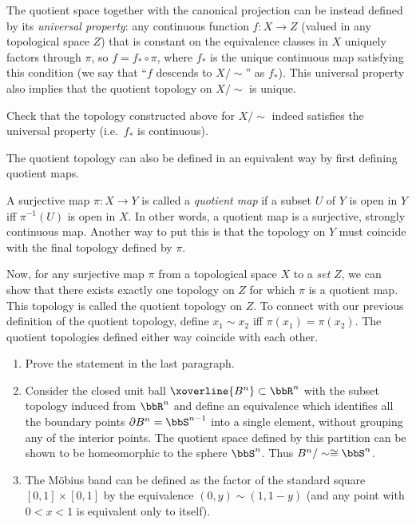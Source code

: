 The quotient space together with the canonical projection can be instead defined by its \emph{universal property}: any continuous function $f:X\to Z$ (valued in any topological space $Z$) that is constant on the equivalence classes in $X$ uniquely factors through  $\pi$, so $f=f_\ast\circ\pi$, where $f_\ast$ is the unique continuous map satisfying this condition (we say that ``$f$ descends to $X/\sim$'' as $f_\ast$). This universal property also implies that the quotient topology on $X\slash\sim$ is unique.

\begin{xca}
Check that the topology constructed above for $X/\sim$ indeed satisfies the universal property (i.e.\ $f_\ast$ is continuous).
\end{xca}

The quotient topology can also be defined in an equivalent way by first defining quotient maps.
\begin{defn}
A surjective map $\pi:X\rightarrow Y$ is called a \emph{quotient map} if a subset $U$ of $Y$ is open in $Y$ iff $\pi^{-1}(U)$ is open in $X$. In other words, a quotient map is a surjective, strongly continuous map. Another way to put this is that the topology on $Y$ must coincide with the final topology defined by $\pi$.
\end{defn}

Now, for any surjective map $\pi$ from a topological space $X$ to a \emph{set} $Z$, we can show that there exists exactly one topology on $Z$ for which $\pi$ is a quotient map. This topology is called the quotient topology on $Z$. To connect with our previous definition of the quotient topology, define $x_1\sim x_2$ iff $\pi(x_1)=\pi(x_2)$. The quotient topologies defined either way coincide with each other.

\begin{example}
\begin{enumerate}
    \item Prove the statement in the last paragraph.
    \item Consider the closed unit ball $\xoverline{B^n}\subset\bbR^n$ with the subset topology induced from $\bbR^n$ and define an equivalence which identifies all the boundary points $\partial B^n = \bbS^{n-1}$ into a single element, without grouping any of the interior points. The quotient space defined by this partition can be shown to be homeomorphic to the sphere $\bbS^n$. Thus $B^n/\sim \cong \bbS^n$.
    \item The M\"obius band can be defined as the factor of the standard square $[0,1]\times[0,1]$ by the equivalence $(0,y)\sim (1,1-y)$ (and any point with $0<x<1$ is equivalent only to itself).
\end{enumerate}
\end{example}

